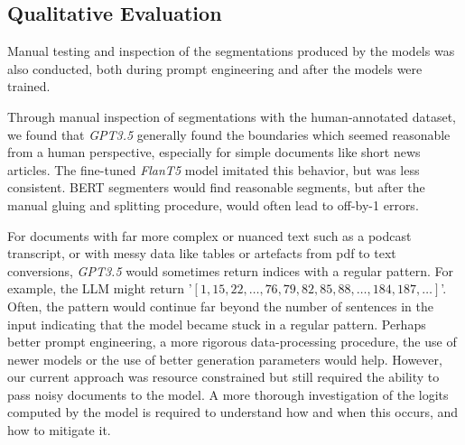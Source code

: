     

\subsection{Qualitative Evaluation}

Manual testing and inspection of the segmentations produced by the models was also conducted, both during prompt engineering and after the models were trained.

Through manual inspection of segmentations with the human-annotated dataset, we found that \emph{GPT3.5} generally found the boundaries which seemed reasonable from a human perspective, especially for simple documents like short news articles. The fine-tuned \emph{FlanT5} model imitated this behavior, but was less consistent. BERT segmenters would find reasonable segments, but after the manual gluing and splitting procedure, would often lead to off-by-1 errors.

For documents with far more complex or nuanced text such as a podcast transcript, or with messy data like tables or artefacts from pdf to text conversions, \emph{GPT3.5} would sometimes return indices with a regular pattern. For example, the LLM might return '$[1,15,22, \ldots, 76, 79, 82, 85, 88, \ldots, 184, 187, \ldots]$'. Often, the pattern would continue far beyond the number of sentences in the input indicating that the model became stuck in a regular pattern. Perhaps better prompt engineering, a more rigorous data-processing procedure, the use of newer models or the use of better generation parameters would help. However, our current approach was resource constrained but still required the ability to pass noisy documents to the model. A more thorough investigation of the logits computed by the model is required to understand how and when this occurs, and how to mitigate it.